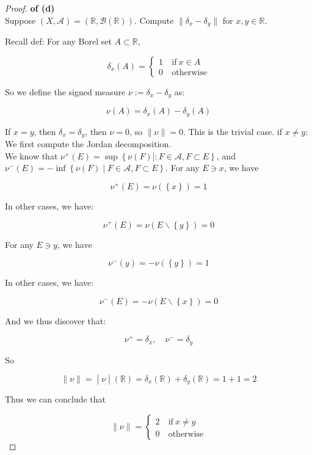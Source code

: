 \begin{proof}

\textbf{of (d)}\\
Suppose \((X,\mathcal{A}) = (\mathbb{R},\mathcal{B}(\mathbb{R}))\). Compute \(\parallel \delta_{x} - \delta_{y} \parallel\) for \(x,y \in \mathbb{R}\).

Recall def: For any Borel set \(A \subset \mathbb{R}\),

\[\delta_{x}(A) = \left\{ \begin{matrix}
{1\ } & {\text{if}\ x \in A} \\
{0\ } & \text{otherwise}
\end{matrix} \right.\]

So we define the signed measure \(\nu := \delta_{x} - \delta_{y}\) as:

\[\nu(A) = \delta_{x}(A) - \delta_{y}(A)\]

If \(x = y\), then \(\delta_{x} = \delta_{y}\), then \(\nu = 0\), so \(\parallel \nu \parallel = 0\). This is the trivial case. if \(x \neq y\): We first compute the Jordan decomposition.\\
We know that \(\nu^{+}(E) = \sup\left\{ {\nu(F) \mid :F \in \mathcal{A},F \subset E} \right\}\), and \(\nu^{-}(E) = - \inf\left\{ {\nu(F) \mid F \in \mathcal{A},F \subset E} \right\}\). For any \(E \ni x\), we have

\[\nu^{+}(E) = \nu(\left\{ x \right\}) = 1\]

In other cases, we have:

\[\nu^{+}(E) = \nu(E\backslash\left\{ y \right\}) = 0\]

For any \(E \ni y\), we have

\[\nu^{-}(y) = - \nu(\left\{ y \right\}) = 1\]

In other cases, we have:

\[\nu^{-}(E) = - \nu(E\backslash\left\{ x \right\}) = 0\]

And we thus discover that:

\[\nu^{+} = \delta_{x},\quad\nu^{-} = \delta_{y}\]

So

\[\left. \parallel \nu \parallel = \middle| \nu \middle| (\mathbb{R}) = \delta_{x}(\mathbb{R}) + \delta_{y}(\mathbb{R}) = 1 + 1 = 2 \right.\]

Thus we can conclude that

\[\parallel \nu \parallel = \left\{ \begin{matrix}
{2\ } & {\text{if}\ x \neq y} \\
{0\ } & \text{otherwise}
\end{matrix} \right.\]

\end{proof}


